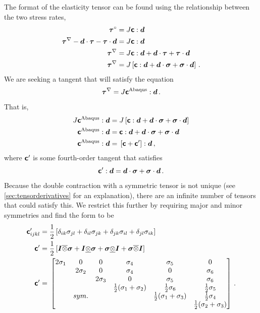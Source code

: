 \documentclass[10pt,letterpaper,oneside]{report}
\newcommand{\ten}[1]{\mbox{\boldmath $#1$}{}}
\newcommand{\tenf}[1]{\mbox{{\sffamily{\bfseries {#1}}}}}
\begin{document}
The format of the elasticity tensor can be found using the relationship between the two stress rates, 
\begin{align}
\ten{ \tau }^{\circ} ={}& J \tenf{c} : \ten{d} 
\\
\ten{\tau}^{\nabla }  - \ten{d} \cdot \ten{\tau} - \ten{\tau} \cdot \ten{d} ={}& J \tenf{c} : \ten{d} 
\notag \\
\ten{\tau}^{\nabla } ={}& J \tenf{c} : \ten{d} + \ten{d} \cdot \ten{\tau} + \ten{\tau} \cdot \ten{d} 
\notag \\
\ten{\tau}^{\nabla } ={}& J \left[ \tenf{c} : \ten{d} + \ten{d} \cdot \ten{\sigma} + \ten{\sigma} \cdot \ten{d} \right] \, .
\end{align}
We are seeking a tangent that will satisfy the equation
\begin{equation}
\ten{\tau}^{\nabla } = J \tenf{c}^\text{Abaqus} : \ten{d} \, . 
\end{equation}
That is, 
\begin{align}
J \tenf{c}^\text{Abaqus} : \ten{d} ={}& J \left[ \tenf{c} : \ten{d} + \ten{d} \cdot \ten{\sigma} + \ten{\sigma} \cdot \ten{d} \right]  
\notag \\
\tenf{c}^\text{Abaqus} : \ten{d} ={}& \tenf{c} : \ten{d} + \ten{d} \cdot \ten{\sigma} + \ten{\sigma} \cdot \ten{d}  
\notag \\
\tenf{c}^\text{Abaqus} : \ten{d} ={}& \left[ \tenf{c} + \tenf{c}' \right] : \ten{d} \, , 
\end{align}
where $\tenf{c}'$ is some fourth-order tangent that satisfies
\begin{equation}
\tenf{c}' : \ten{d}  = \ten{d} \cdot \ten{\sigma} + \ten{\sigma} \cdot \ten{d} \, . 
\end{equation}
Because the double contraction with a symmetric tensor is not unique (see \autoref{sec:tensorderivatives} for an explanation), there are an infinite number of tensors that could satisfy this.  We restrict this further by requiring major and minor symmetries and find the form to be
\begin{align}
\tenf{c}'_{ijkl} ={}& \frac{1}{2} \left[ \delta_{ik}\sigma_{jl} + \delta_{il}\sigma_{jk} + \delta_{jk}\sigma_{il} + \delta_{jl}\sigma_{ik} \right]
\\
\tenf{c}' ={}& \frac{1}{2} \left[ \ten{I} \overline{\otimes} \ten{ \sigma}  + \ten{I} \underline{\otimes} \ten{\sigma} + \ten{\sigma} \underline{\otimes} \ten{I} + \ten{\sigma} \overline{\otimes} \ten{I} \right] 
\\
\tenf{c}' ={}& \begin{bmatrix}
2\sigma_1 & 0 & 0 & \sigma_4 & \sigma_5 & 0 \\
 & 2\sigma_2 & 0 & \sigma_4 & 0 & \sigma_6 \\
 &  & 2\sigma_3 & 0 & \sigma_5 & \sigma_6 \\
 &  &  & \frac{1}{2} (\sigma_1 + \sigma_2) & \frac{1}{2} \sigma_6 & \frac{1}{2} \sigma_5 \\
 & sym. &  &  & \frac{1}{2} (\sigma_1 + \sigma_3) & \frac{1}{2} \sigma_4 \\
 \label{geometric_tangent}
 &  &  &  &  & \frac{1}{2} (\sigma_2 + \sigma_3)
\end{bmatrix} \, .
\end{align}
\end{document}
